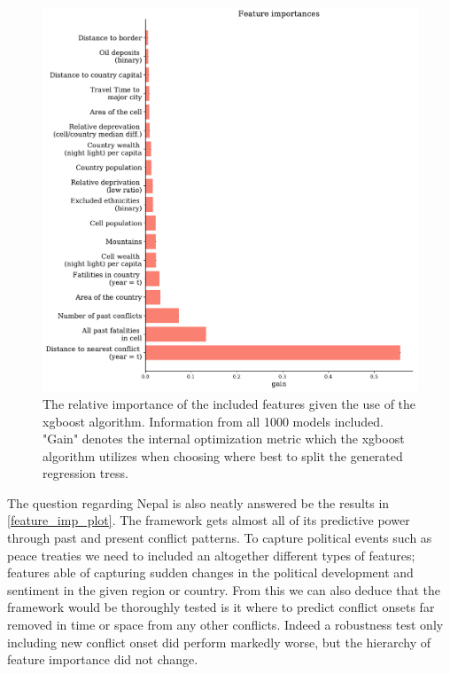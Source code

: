 \documentclass[a4paper]{article}
\begin{document}
\begin{figure}[!htb]
	\centering
	\includegraphics[scale=0.5]{feature_imp.pdf}
    \caption{\footnotesize{The relative importance of the included features given the use of the xgboost algorithm. Information from all 1000 models included. "Gain" denotes the internal optimization metric which the xgboost algorithm utilizes when choosing where best to split the generated regression tress.}}\label{feature_imp_plot}
\end{figure}

The question regarding Nepal is also neatly answered be the results in \autoref{feature_imp_plot}. The framework gets almost all of its predictive power through past and present conflict patterns. To capture political events such as peace treaties we need to included an altogether different types of features; features able of capturing sudden changes in the political development and sentiment in the given region or country. From this we can also deduce that the framework would be thoroughly tested is it where to predict conflict onsets far removed in time or space from any other conflicts. Indeed a robustness test only including new conflict onset did perform markedly worse, but the hierarchy of feature importance did not change.\par
\end{document}

